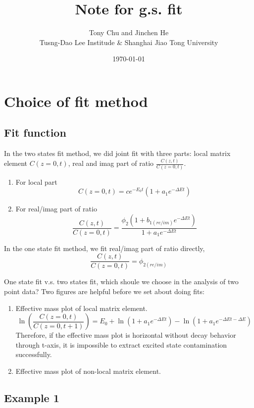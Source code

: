 \documentclass{article}
\title{Note for g.s. fit}
\author{Tony Chu and Jinchen He\\ \small Tusng-Dao Lee Institude \& Shanghai Jiao Tong University}
\date{\today}
\begin{document}
\maketitle
\tableofcontents
\pagebreak[4]
\section{Choice of fit method}

\subsection{Fit function}
In the two states fit method, we did joint fit with three parts: local matrix element $C(z=0, t)$, real and imag part of ratio $\frac{C(z, t)}{C(z=0, t)}$. 
\begin{enumerate}
    \item For local part
    \[ C(z=0, t) = c e^{-E_{0} t}\left(1+a_{1} e^{-\Delta E t}\right) \]
    \item For real/imag part of ratio
    \[ \frac{C(z, t)}{C(z=0, t)} = \frac{\phi_{2}\left(1+b_{1 (re/im)} e^{-\Delta E t}\right)}{1+a_{1} e^{-\Delta E t}} \]
\end{enumerate}

In the one state fit method, we fit real/imag part of ratio directly,
\[ \frac{C(z, t)}{C(z=0, t)} = \phi_{2 (re/im)} \]

One state fit v.s. two states fit, which shoule we choose in the analysis of two point data? Two figures are helpful before we set about doing fits:

\begin{enumerate}
    \item Effective mass plot of local matrix element.
    \[ \ln(\frac{C(z=0, t)}{C(z=0, t+1)}) = E_0 + \ln(1 + a_1 e^{-\Delta E t}) - \ln(1 + a_1 e^{-\Delta E t - \Delta E}) \]
    Therefore, if the effective mass plot is horizontal without decay behavior through t-axis, it is impossible to extract excited state contamination successfully.
    \item Effective mass plot of non-local matrix element.
    
\end{enumerate}



\subsection{Example 1}
\end{document}

